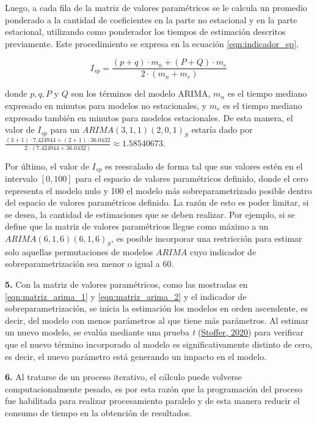 \documentclass[
]{article}
\begin{document}
Luego, a cada fila de la matriz de valores paramétricos se le calcula un
promedio ponderado a la cantidad de coeficientes en la parte no
estacional y en la parte estacional, utilizando como ponderador los
tiempos de estimación descritos previamente. Este procedimiento se
expresa en la ecuación \ref{eqn:indicador_sp},

\begin{equation}
\label{eqn:indicador_sp}
I_{sp} = \frac{(p+q) \cdot m_n + (P+Q) \cdot m_e}{2\cdot(m_n+m_e)}
\end{equation}

donde \(p,q,P\) y \(Q\) son los términos del modelo ARIMA, \(m_n\) es el
tiempo mediano expresado en minutos para modelos no estacionales, y
\(m_e\) es el tiempo mediano expresado también en minutos para modelos
estacionales. De esta manera, el valor de \(I_{sp}\) para un
\(ARIMA(3,1,1)(2,0,1)_S\) estaría dado por
\(\frac{(3+1) \cdot 7.424944 + (2+1) \cdot 36.0432}{2\cdot(7.424944+36.0432)} \approx 1.58540673\).

Por último, el valor de \(I_{sp}\) es reescalado de forma tal que sus
valores estén en el intervalo \([0,100]\) para el espacio de valores
paramétricos definido, donde el cero representa el modelo nulo y 100 el
modelo más sobreparametrizado posible dentro del espacio de valores
paramétricos definido. La razón de esto es poder limitar, si se desea,
la cantidad de estimaciones que se deben realizar. Por ejemplo, si se
define que la matriz de valores paramétricos llegue como máximo a un
\(ARIMA(6,1,6)(6,1,6)_S\), es posible incorporar una restricción para
estimar solo aquellas permutaciones de modelos \(ARIMA\) cuyo indicador
de sobreparametrización sea menor o igual a 60.

\textbf{5.} Con la matriz de valores paramétricos, como las mostradas en
\ref{eqn:matriz_arima_1} y \ref{eqn:matriz_arima_2} y el indicador de
sobreparametrización, se inicia la estimación los modelos en orden
ascendente, es decir, del modelo con menos parámetros al que tiene más
parámetros. Al estimar un nuevo modelo, se evalúa mediante una prueba
\emph{t} (\protect\hyperlink{ref-astsa}{Stoffer, 2020}) para verificar
que el nuevo término incorporado al modelo es significativamente
distinto de cero, es decir, el nuevo parámetro está generando un impacto
en el modelo.

\textbf{6.} Al tratarse de un proceso iterativo, el cálculo puede
volverse computacionalmente pesado, es por esta razón que la
programación del proceso fue habilitada para realizar procesamiento
paralelo y de esta manera reducir el consumo de tiempo en la obtención
de resultados.
\end{document}

